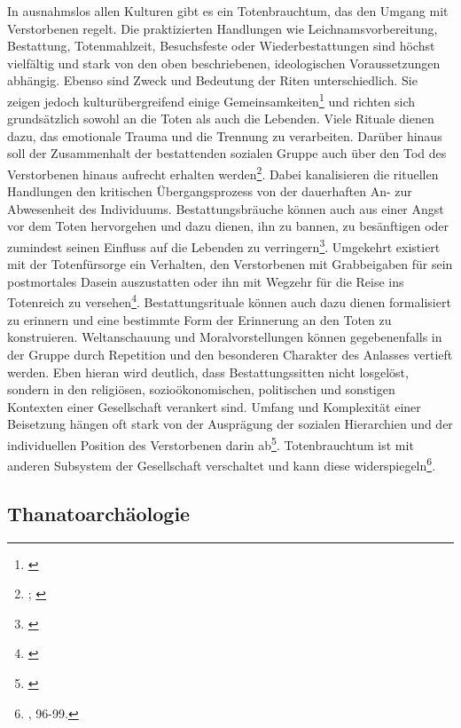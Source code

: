 \documentclass[openany,twoside,twocolumn]{book}
\let\rmarkdownfootnote\footnote%
\def\footnote{\protect\rmarkdownfootnote}
\begin{document}
In ausnahmslos allen Kulturen gibt es ein Totenbrauchtum, das den Umgang
mit Verstorbenen regelt. Die praktizierten Handlungen wie
Leichnamsvorbereitung, Bestattung, Totenmahlzeit, Besuchsfeste oder
Wiederbestattungen sind höchst vielfältig und stark von den oben
beschriebenen, ideologischen Voraussetzungen abhängig. Ebenso sind Zweck
und Bedeutung der Riten unterschiedlich. Sie zeigen jedoch
kulturübergreifend einige Gemeinsamkeiten\footnote{\textcite{macho_stichwort_1997}}
und richten sich grundsätzlich sowohl an die Toten als auch die
Lebenden. Viele Rituale dienen dazu, das emotionale Trauma und die
Trennung zu verarbeiten. Darüber hinaus soll der Zusammenhalt der
bestattenden sozialen Gruppe auch über den Tod des Verstorbenen hinaus
aufrecht erhalten werden\footnote{\textcite{gladigow_naturae_1997};
  \textcite{hasenfratz_zum_1983}}. Dabei kanalisieren die rituellen
Handlungen den kritischen Übergangsprozess von der dauerhaften An- zur
Abwesenheit des Individuums. Bestattungsbräuche können auch aus einer
Angst vor dem Toten hervorgehen und dazu dienen, ihn zu bannen, zu
besänftigen oder zumindest seinen Einfluss auf die Lebenden zu
verringern\footnote{\textcite{lauf_im_1997}}. Umgekehrt existiert mit
der Totenfürsorge ein Verhalten, den Verstorbenen mit Grabbeigaben für
sein postmortales Dasein auszustatten oder ihn mit Wegzehr für die Reise
ins Totenreich zu versehen\footnote{\textcite{nebelsick_doppelte_1995}}.
Bestattungsrituale können auch dazu dienen formalisiert zu erinnern und
eine bestimmte Form der Erinnerung an den Toten zu konstruieren.
Weltanschauung und Moralvorstellungen können gegebenenfalls in der
Gruppe durch Repetition und den besonderen Charakter des Anlasses
vertieft werden. Eben hieran wird deutlich, dass Bestattungssitten nicht
losgelöst, sondern in den religiösen, sozioökonomischen, politischen und
sonstigen Kontexten einer Gesellschaft verankert sind. Umfang und
Komplexität einer Beisetzung hängen oft stark von der Ausprägung der
sozialen Hierarchien und der individuellen Position des Verstorbenen
darin ab\footnote{\textcite{harke_final_1997}}. Totenbrauchtum ist mit
anderen Subsystem der Gesellschaft verschaltet und kann diese
widerspiegeln\footnote{\textcite{hofmann_rituelle_2008}, 96-99.}.

\hypertarget{archaeology-of-death}{%
\subsection{Thanatoarchäologie}\label{archaeology-of-death}}
\end{document}
